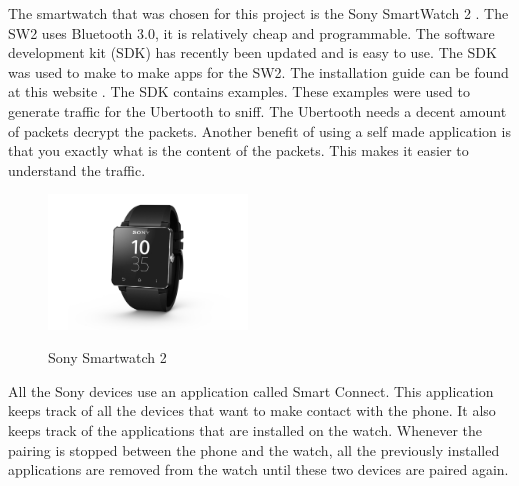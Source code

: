 \label{subsec:sw2}
The smartwatch that was chosen for this project is the Sony SmartWatch 2 \cite{sw2}. The SW2 uses Bluetooth 3.0, it is relatively cheap and programmable. The software development kit (SDK) has recently been updated and is easy to use. The SDK was used to make to make apps for the SW2. The installation guide can be found at this website \cite{sw2getstarted}. The SDK contains examples. These examples were used to generate traffic for the Ubertooth to sniff. The Ubertooth needs a decent amount of packets decrypt the packets. Another benefit of using a self made application is that you exactly what is the content of the packets. This makes it easier to understand the traffic.
\begin{figure}[!h]
  \begin{center}
	\includegraphics[width=200px]{images/sw2.jpg}
	\label{fig:sw2}
	\caption{Sony Smartwatch 2}
  \end{center}
\end{figure}
\newpage
All the Sony devices use an application called Smart Connect. This application keeps track of all the devices that want to make contact with the phone. It also keeps track of the applications that are installed on the watch. Whenever the pairing is stopped between the phone and the watch, all the previously installed applications are removed from the watch until these two devices are paired again.
